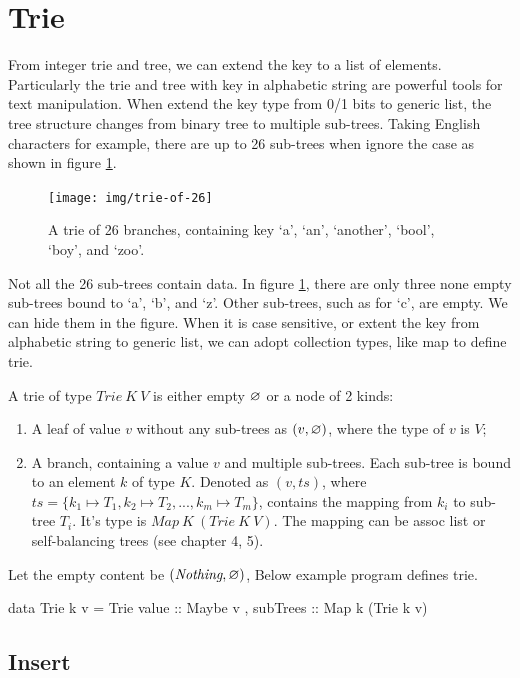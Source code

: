 \documentclass[b5paper]{article}
\begin{document}
\section{Trie}
From integer trie and tree, we can extend the key to a list of elements. Particularly the trie and tree with key in alphabetic string are powerful tools for text manipulation. When extend the key type from 0/1 bits to generic list, the tree structure changes from binary tree to multiple sub-trees. Taking English characters for example, there are up to 26 sub-trees when ignore the case as shown in figure \ref{fig:trie-of-26}.

\begin{figure}[htbp]
  \centering
  \texttt{[image: img/trie-of-26]}
  \caption{A trie of 26 branches, containing key `a', `an', `another', `bool', `boy', and `zoo'.}
  \label{fig:trie-of-26}
\end{figure}

Not all the 26 sub-trees contain data. In figure \ref{fig:trie-of-26}, there are only three none empty sub-trees bound to `a', `b', and `z'. Other sub-trees, such as for `c', are empty. We can hide them in the figure. When it is case sensitive, or extent the key from alphabetic string to generic list, we can adopt collection types, like map to define trie.

A trie of type $Trie\ K\ V$ is either empty $\varnothing$ or a node of 2 kinds:

\begin{enumerate}
\item A leaf of value $v$ without any sub-trees as $(v, \varnothing)$, where the type of $v$ is $V$;
\item A branch, containing a value $v$ and multiple sub-trees. Each sub-tree is bound to an element $k$ of type $K$. Denoted as $(v, ts)$, where $ts = \{ k_1 \mapsto T_1, k_2 \mapsto T_2, ..., k_m \mapsto T_m \}$, contains the mapping from $k_i$ to sub-tree $T_i$. It's type is $Map\ K\ (Trie\ K\ V)$. The mapping can be assoc list or self-balancing trees (see chapter 4, 5).
\end{enumerate}

Let the empty content be $(\textit{Nothing}, \varnothing)$, Below example program defines trie.

\begin{Haskell}
data Trie k v = Trie { value :: Maybe v
                     , subTrees :: Map k (Trie k v)}
\end{Haskell}

\subsection{Insert}
\end{document}
